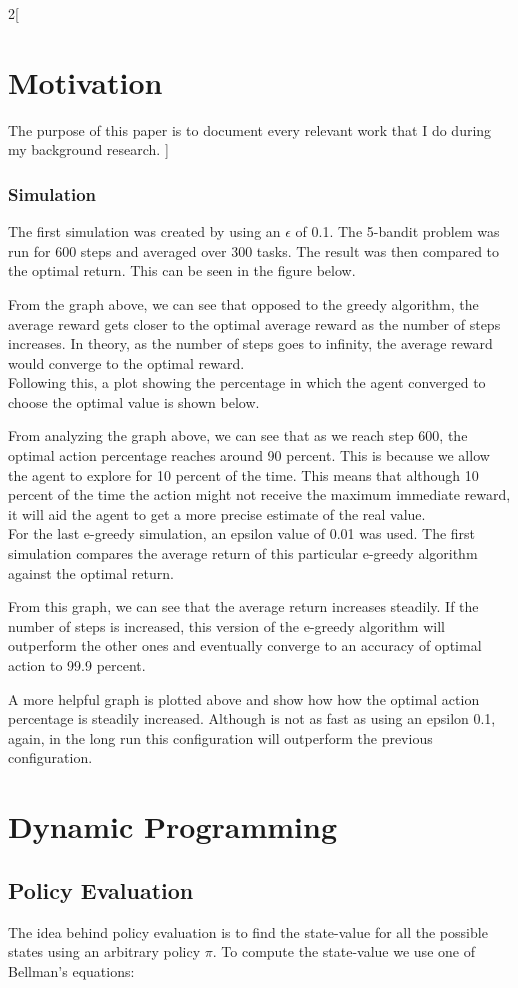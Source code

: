 \documentclass[a4paper]{article}
\begin{document}
\begin{multicols}{2}[
		\section*{Motivation}
		The purpose of this paper is to document every relevant work that I do during my background research.
		]
		\subsubsection{Simulation}
		The first simulation was created by using an $\epsilon$ of 0.1. The 5-bandit problem was run for 600 steps and averaged over 300 tasks. The result was then compared to the optimal return. This can be seen in the figure below.

		
		From the graph above, we can see that opposed to the greedy algorithm, the average reward gets closer to the optimal average reward as the number of steps increases. In theory, as the number of steps goes to infinity, the average reward would converge to the optimal reward. \\
		
		Following this, a plot showing the percentage in which the agent converged to choose the optimal value is shown below.
		

		
		From analyzing the graph above, we can see that as we reach step 600, the optimal action percentage reaches around 90 percent. This is because we allow the agent to explore for 10 percent of the time. This means that although 10 percent of the time the action might not receive the maximum immediate reward, it will aid the agent to get a more precise estimate of the real value. \\
		
		For the last e-greedy simulation, an epsilon value of 0.01 was used. The first simulation compares the average return of this particular e-greedy algorithm against the optimal return.
		
		
		From this graph, we can see that the average return increases steadily. If the number of steps is increased, this version of the e-greedy algorithm will outperform the other ones and eventually converge to an accuracy of optimal action to 99.9 percent.
		
	
		A more helpful graph is plotted above and show how how the optimal action percentage is steadily increased. Although is not as fast as using an epsilon 0.1, again, in the long run this configuration will outperform the previous configuration.
		
		\section{Dynamic Programming}
		\subsection{Policy Evaluation}
		The idea behind policy evaluation is to find the state-value for all the possible states using an arbitrary policy $\pi$. To compute the state-value we use one of Bellman's equations:
		

\end{multicols}
\end{document}
